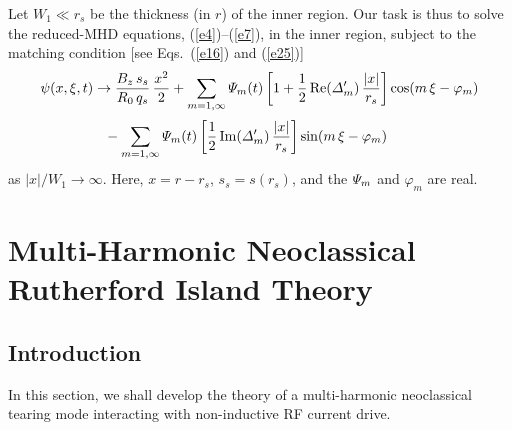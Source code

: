 \documentclass[12pt,prb,aps]{revtex4-1}
\begin{document}
Let $W_1\ll r_s$ be the thickness (in $r$) of the inner region. Our task is thus to solve the   reduced-MHD equations, (\ref{e4})--(\ref{e7}), in the inner region,  subject to the matching 
condition [see Eqs.~(\ref{e16}) and (\ref{e25})]
\begin{align}\label{e26}
\psi(x,\xi,t) &\rightarrow \frac{B_z\,s_s}{R_0\,q_s}\,\frac{x^2}{2} +\sum_{m=1,\infty}
{\mit\Psi}_m(t)\left[1+\frac{1}{2}\,{\rm Re}({\mit\Delta}_m')\,\frac{|x|}{r_s}\right]\cos(m\,\xi-\varphi_m)\nonumber\\[0.5ex]
&\phantom{=} -\sum_{m=1,\infty}{\mit\Psi}_m(t)\left[\frac{1}{2}\,{\rm Im}({\mit\Delta}_m')\,\frac{|x|}{r_s}\right]\sin(m\,\xi-\varphi_m)
\end{align}
as $|x|/W_1\rightarrow\infty$. Here, $x=r-r_s$, $s_s=s(r_s)$, and the ${\mit\Psi}_m$ and $\varphi_m$ are real. 

\section{Multi-Harmonic Neoclassical Rutherford Island Theory}
\subsection{Introduction}
In this section, we shall develop the theory of a multi-harmonic neoclassical tearing mode interacting with non-inductive RF current drive.
\end{document}
